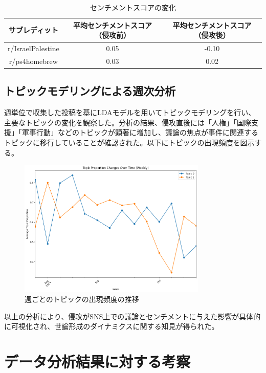 \documentclass[11pt, a4j]{jreport}
\begin{document}
    \begin{table}[H]
        \centering
        \begin{tabular}{|c|c|c|}
            \hline
            サブレディット & 平均センチメントスコア（侵攻前） & 平均センチメントスコア（侵攻後） \\
            \hline
            r/IsraelPalestine & 0.05 & -0.10 \\
            r/ps4homebrew & 0.03 & 0.02 \\
            \hline
        \end{tabular}
        \caption{センチメントスコアの変化}
    \end{table}
    
    \section{トピックモデリングによる週次分析}
    週単位で収集した投稿を基にLDAモデルを用いてトピックモデリングを行い、主要なトピックの変化を観察した。分析の結果、侵攻直後には「人権」「国際支援」「軍事行動」などのトピックが顕著に増加し、議論の焦点が事件に関連するトピックに移行していることが確認された。以下にトピックの出現頻度を図示する。
    
    \begin{figure}[H]
        \centering
        \includegraphics[width=0.8\textwidth]{topic_trends_plot.png}
        \caption{週ごとのトピックの出現頻度の推移}
    \end{figure}
    
    以上の分析により、侵攻がSNS上での議論とセンチメントに与えた影響が具体的に可視化され、世論形成のダイナミクスに関する知見が得られた。    

    \chapter{データ分析結果に対する考察}
\end{document}
